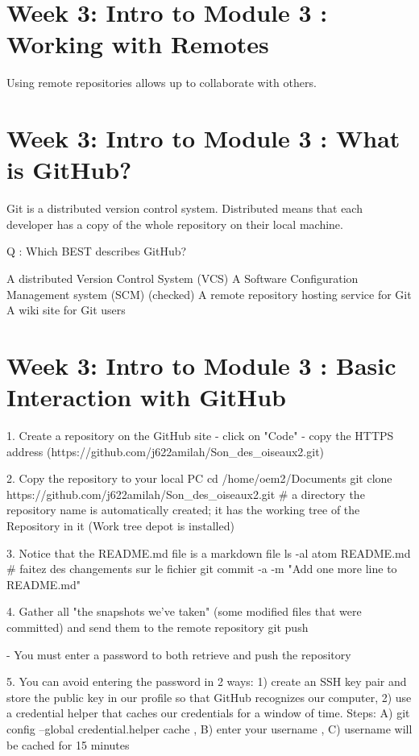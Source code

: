 \documentclass[11pt, onecolumn]{article}
\begin{document}

\section{Week 3: Intro to Module 3 : Working with Remotes}

Using remote repositories allows up to collaborate with others.

\section{Week 3: Intro to Module 3 : What is GitHub?}

Git is a distributed version control system.
Distributed means that each developer has a copy of the whole repository on their local machine. 

Q : Which BEST describes GitHub?

A distributed Version Control System (VCS)
A Software Configuration Management system (SCM)
(checked) A remote repository hosting service for Git
A wiki site for Git users



\section{Week 3: Intro to Module 3 : Basic Interaction with GitHub}

1. Create a repository on the GitHub site - click on "Code" - copy the HTTPS address (https://github.com/j622amilah/Son_des_oiseaux2.git)

2. Copy the repository to your local PC
cd /home/oem2/Documents
git clone https://github.com/j622amilah/Son_des_oiseaux2.git  # a directory the repository name is automatically created; it has the working tree of the Repository in it (Work tree depot is installed)

3. Notice that the README.md file is a markdown file
ls -al
atom README.md   # faitez des changements sur le fichier
git commit -a -m "Add one more line to README.md"

4. Gather all "the snapshots we've taken" (some modified files that were committed) and send them to the remote repository
git push

- You must enter a password to both retrieve and push the repository

5. You can avoid entering the password in 2 ways: 1) create an SSH key pair and store
the public key in our profile so that GitHub recognizes our computer, 2) use a credential helper that caches our credentials for a window of time. Steps: A) git config --global credential.helper cache , B) enter your username , C) username will be cached for 15 minutes
\end{document}
